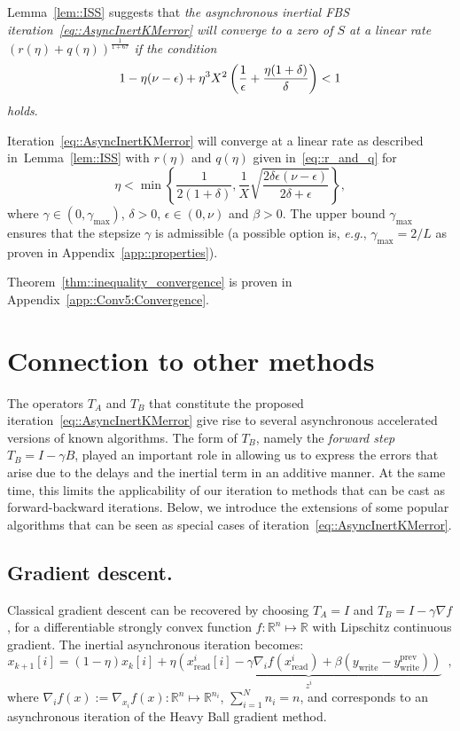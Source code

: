\documentclass[envcountsect]{svjour3}
\newcommand{\eg}{{\it e.g.}}
\newcommand{\reals}{{\mathbb{R} }}
\begin{document}
Lemma~\ref{lem::ISS} suggests that \emph{the asynchronous inertial FBS iteration~\eqref{eq::AsyncInertKMerror} will converge to a zero of $S$ at a linear rate $(r(\eta)+q(\eta))^\frac{1}{1+6\tau}$ if the condition}
\begin{equation}{\label{eq::EquationConvergence}}
 1-\eta(\nu-\epsilon) + \eta^3X^2\left(\frac{1}{\epsilon}+\frac{\eta(1+\delta)}{\delta}\right) < 1
\end{equation}
\emph{holds}.
\begin{theorem}{\label{thm::inequality_convergence}}
 Iteration~\eqref{eq::AsyncInertKMerror} will converge at a linear rate as described in~Lemma~\ref{lem::ISS}
 with $r(\eta)$ and $q(\eta)$ given in~\eqref{eq::r_and_q} for
 \[
  \eta < \min\left\{\frac{1}{2(1+\delta)},\frac{1}{X}\sqrt{\frac{2\delta\epsilon(\nu-\epsilon)}{2\delta+\epsilon}}\right\},
 \]
 where $\gamma\in(0,\gamma_{\max})$, $\delta>0$, $\epsilon\in(0,\nu)$ and $\beta>0$. The upper bound $\gamma_{\max}$ ensures that the stepsize $\gamma$ is admissible (a possible option is, \eg, $\gamma_{\max}=2/L$ as proven in Appendix~\ref{app::properties}).
\end{theorem}
Theorem~\ref{thm::inequality_convergence} is proven in Appendix~\ref{app::Conv5:Convergence}.

\section{Connection to other methods}\label{sec::algorithms}
The operators $T_A$ and $T_B$ that constitute the proposed iteration~\eqref{eq::AsyncInertKMerror} give rise to several asynchronous accelerated versions of known algorithms. The form of $T_B$, namely the \emph{forward step} $T_B=I-\gamma B$, played an important role in allowing us to express the errors that arise due to the delays and the inertial term in an additive manner. At the same time, this limits the applicability of our iteration to methods that can be cast as forward-backward iterations. Below, we introduce the extensions of some popular algorithms that can be seen as special cases of iteration~\eqref{eq::AsyncInertKMerror}.


\subsection{Gradient descent. }{\label{subsec::gradient}}
 Classical gradient descent can be recovered by choosing $T_A=I$ and $T_B=I-\gamma\nabla f$, for a differentiable strongly convex function $f:\reals^n\mapsto\reals$ with Lipschitz continuous gradient. The inertial asynchronous iteration becomes:
 \[
   x_{k+1}[i] = (1-\eta)x_{k}[i] + \eta\underbrace{\left(x_\mathrm{read}^i[i]-\gamma\nabla_{i}f(x_\mathrm{read}^i) + \beta(y_\mathrm{write}-y_\mathrm{write}^\mathrm{prev})\right)}_{z^i}\enspace,
 \]
 where $\nabla_i f(x) := \nabla_{x_i} f(x): \reals^n\mapsto\reals^{n_i}$, $\sum_{i=1}^Nn_i=n$, and corresponds to an asynchronous iteration of the Heavy Ball gradient method.
\end{document}
